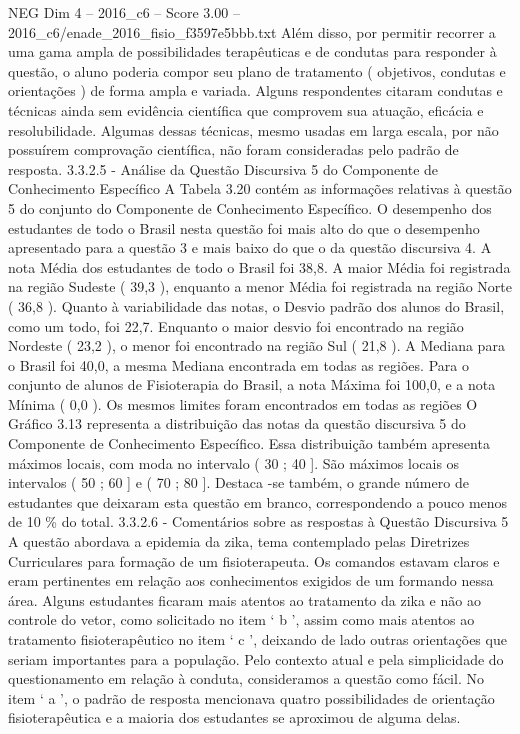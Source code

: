 \begin{textsample}{NEG Dim 4 – 2016\_c6 – Score 3.00 – 2016\_c6/enade\_2016\_fisio\_f3597e5bbb.txt}
Além disso, por permitir recorrer a uma gama ampla de possibilidades terapêuticas e de condutas para responder à questão, o aluno poderia compor seu plano de tratamento ( objetivos, condutas e orientações ) de forma ampla e variada.
Alguns respondentes citaram condutas e técnicas ainda sem evidência científica que comprovem sua atuação, eficácia e resolubilidade.
Algumas dessas técnicas, mesmo usadas em larga escala, por não possuírem comprovação científica, não foram consideradas pelo padrão de resposta. 3.3.2.5 - Análise da Questão Discursiva 5 do Componente de Conhecimento Específico A Tabela 3.20 contém as informações relativas à questão 5 do conjunto do Componente de Conhecimento Específico.
O desempenho dos estudantes de todo o Brasil nesta questão foi mais alto do que o desempenho apresentado para a questão 3 e mais baixo do que o da questão discursiva 4.
A nota Média dos estudantes de todo o Brasil foi 38,8.
A maior Média foi registrada na região Sudeste ( 39,3 ), enquanto a menor Média foi registrada na região Norte ( 36,8 ).
Quanto à variabilidade das notas, o Desvio padrão dos alunos do Brasil, como um todo, foi 22,7.
Enquanto o maior desvio foi encontrado na região Nordeste ( 23,2 ), o menor foi encontrado na região Sul ( 21,8 ).
A Mediana para o Brasil foi 40,0, a mesma Mediana encontrada em todas as regiões.
Para o conjunto de alunos de Fisioterapia do Brasil, a nota Máxima foi 100,0, e a nota Mínima ( 0,0 ).
Os mesmos limites foram encontrados em todas as regiões O Gráfico 3.13 representa a distribuição das notas da questão discursiva 5 do Componente de Conhecimento Específico.
Essa distribuição também apresenta máximos locais, com moda no intervalo ( 30 ; 40 ].
São máximos locais os intervalos ( 50 ; 60 ] e ( 70 ; 80 ].
Destaca -se também, o grande número de estudantes que deixaram esta questão em branco, correspondendo a pouco menos de 10 \% do total. 3.3.2.6 - Comentários sobre as respostas à Questão Discursiva 5 A questão abordava a epidemia da zika, tema contemplado pelas Diretrizes Curriculares para formação de um fisioterapeuta.
Os comandos estavam claros e eram pertinentes em relação aos conhecimentos exigidos de um formando nessa área.
Alguns estudantes ficaram mais atentos ao tratamento da zika e não ao controle do vetor, como solicitado no item ‘ b ’, assim como mais atentos ao tratamento fisioterapêutico no item ‘ c ’, deixando de lado outras orientações que seriam importantes para a população.
Pelo contexto atual e pela simplicidade do questionamento em relação à conduta, consideramos a questão como fácil.
No item ‘ a ’, o padrão de resposta mencionava quatro possibilidades de orientação fisioterapêutica e a maioria dos estudantes se aproximou de alguma delas.

\end{textsample}

